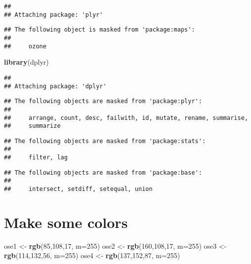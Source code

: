 \documentclass[
]{article}
\newenvironment{Shaded}{\begin{snugshade}}{\end{snugshade}}
\newcommand{\DataTypeTok}[1]{\textcolor[rgb]{0.13,0.29,0.53}{#1}}
\newcommand{\DecValTok}[1]{\textcolor[rgb]{0.00,0.00,0.81}{#1}}
\newcommand{\KeywordTok}[1]{\textcolor[rgb]{0.13,0.29,0.53}{\textbf{#1}}}
\newcommand{\NormalTok}[1]{#1}
\newcommand{\StringTok}[1]{\textcolor[rgb]{0.31,0.60,0.02}{#1}}
\begin{document}
\begin{verbatim}
## 
## Attaching package: 'plyr'
\end{verbatim}

\begin{verbatim}
## The following object is masked from 'package:maps':
## 
##     ozone
\end{verbatim}

\begin{Shaded}
\begin{Highlighting}[]
\KeywordTok{library}\NormalTok{(dplyr)}
\end{Highlighting}
\end{Shaded}

\begin{verbatim}
## 
## Attaching package: 'dplyr'
\end{verbatim}

\begin{verbatim}
## The following objects are masked from 'package:plyr':
## 
##     arrange, count, desc, failwith, id, mutate, rename, summarise,
##     summarize
\end{verbatim}

\begin{verbatim}
## The following objects are masked from 'package:stats':
## 
##     filter, lag
\end{verbatim}

\begin{verbatim}
## The following objects are masked from 'package:base':
## 
##     intersect, setdiff, setequal, union
\end{verbatim}

\hypertarget{make-some-colors}{%
\section{Make some colors}\label{make-some-colors}}

\begin{Shaded}
\begin{Highlighting}[]
\NormalTok{ose1 <-}\StringTok{ }\KeywordTok{rgb}\NormalTok{(}\DecValTok{85}\NormalTok{,}\DecValTok{108}\NormalTok{,}\DecValTok{17}\NormalTok{, }\DataTypeTok{m=}\DecValTok{255}\NormalTok{)}
\NormalTok{ose2 <-}\StringTok{ }\KeywordTok{rgb}\NormalTok{(}\DecValTok{160}\NormalTok{,}\DecValTok{108}\NormalTok{,}\DecValTok{17}\NormalTok{, }\DataTypeTok{m=}\DecValTok{255}\NormalTok{)}
\NormalTok{ose3 <-}\StringTok{ }\KeywordTok{rgb}\NormalTok{(}\DecValTok{114}\NormalTok{,}\DecValTok{132}\NormalTok{,}\DecValTok{56}\NormalTok{, }\DataTypeTok{m=}\DecValTok{255}\NormalTok{)}
\NormalTok{ose4 <-}\StringTok{ }\KeywordTok{rgb}\NormalTok{(}\DecValTok{137}\NormalTok{,}\DecValTok{152}\NormalTok{,}\DecValTok{87}\NormalTok{, }\DataTypeTok{m=}\DecValTok{255}\NormalTok{)}
\end{Highlighting}
\end{Shaded}
\end{document}
